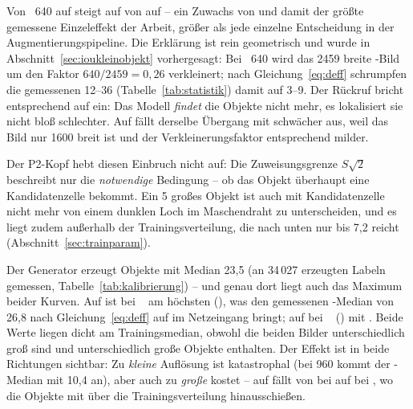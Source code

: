 

Von ~640 auf \zswValBestAt{} steigt \mAPfifty{} auf  von
\zswValNiedrig{} auf \zswValBest{} -- ein Zuwachs von \zswValGain\PP{} und damit der
größte gemessene Einzeleffekt der Arbeit, größer als jede einzelne Entscheidung
in der Augmentierungspipeline. Die Erklärung ist rein geometrisch und wurde in
Abschnitt~\ref{sec:ioukleinobjekt} vorhergesagt: Bei ~640 wird das
2459\px{} breite -Bild um den Faktor $640/2459 = 0{,}26$ verkleinert;
nach Gleichung~\eqref{eq:deff} schrumpfen die gemessenen 12--36\px{}
(Tabelle~\ref{tab:statistik}) damit auf 3--9\px. Der Rückruf bricht entsprechend auf
\zswValNiedrigRec{} ein: Das Modell \emph{findet} die Objekte nicht mehr, es
lokalisiert sie nicht bloß schlechter. Auf  fällt derselbe Übergang
mit \zswTestGain\PP{} schwächer aus, weil das Bild nur 1600\px{} breit ist und
der Verkleinerungsfaktor entsprechend milder.

Der P2-Kopf hebt diesen Einbruch nicht auf: Die Zuweisungsgrenze
$S\sqrt{2}$ beschreibt nur die \emph{notwendige} Bedingung -- ob das Objekt
überhaupt eine Kandidatenzelle bekommt. Ein 5\px{} großes Objekt ist auch mit
Kandidatenzelle nicht mehr von einem dunklen Loch im Maschendraht zu
unterscheiden, und es liegt zudem außerhalb der Trainingsverteilung, die nach
unten nur bis 7,2\px{} reicht (Abschnitt~\ref{sec:trainparam}).

 Der Generator erzeugt Objekte mit Median 23,5\px{} (an 34\,027 erzeugten Labeln
gemessen, Tabelle~\ref{tab:kalibrierung}) -- und genau dort liegt auch das
Maximum beider Kurven. Auf  ist \mAPfifty{} bei
~\zswValBestAt{} am höchsten (\zswValBest), was den gemessenen
-Median von 26,8\px{} nach Gleichung~\eqref{eq:deff} auf
\zswValBestDeff\px{} im Netzeingang bringt;
auf  bei ~\zswTestBestAt{} (\zswTestBest) mit
\zswTestBestDeff\px. Beide Werte liegen dicht am Trainingsmedian, obwohl die
beiden Bilder unterschiedlich groß sind und unterschiedlich große Objekte
enthalten. Der Effekt ist in beide Richtungen sichtbar: Zu \emph{kleine}
Auflösung ist katastrophal (bei 960 kommt der -Median mit 10,4\px{}
an), aber auch zu \emph{große} kostet -- auf  fällt \mAPfifty{} von
\zswTestBest{} bei \zswTestBestAt{} auf \zswTestHoch{} bei \zswTestHochAt, wo die
Objekte mit \zswTestHochDeff\px{} über die Trainingsverteilung hinausschießen.

